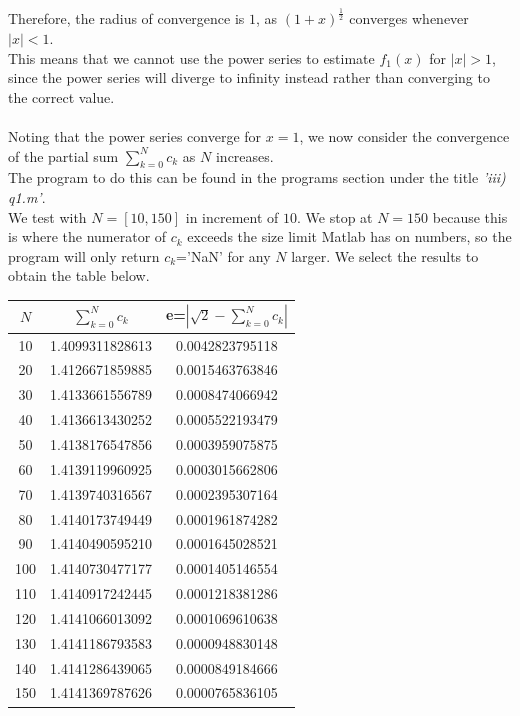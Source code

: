 \documentclass[10pt]{article}
\begin{document}
Therefore, the radius of convergence is $1$, as $(1+x)^{\frac{1}{2}}$ converges whenever $|x|<1$. \\
This means that we cannot use the power series to estimate $f_1(x)$ for $|x|>1$, since the power series will diverge to infinity instead rather than converging to the correct value.\\\\
\noindent Noting that the power series converge for $x=1$, we now consider the convergence of the partial sum $\sum^N_{k=0}c_k$ as $N$ increases.\\
The program to do this can be found in the programs section under the title \emph{'iii) q1.m'}.\\
We test with $N=[10,150]$ in increment of $10$. We stop at $N=150$ because this is where the numerator of $c_k$ exceeds the size limit Matlab has on numbers, so the program will only return $c_k$='NaN' for any $N$ larger. We select the results to obtain the table below.\\
\begin{center}
    \begin{tabular}{c|c|c}
    $N$ & $\sum_{k=0}^N c_k$ & e=$|\sqrt{2}-\sum_{k=0}^N c_k|$\\
    \hline
    10  & 1.4099311828613  & 0.0042823795118 \\
    20  & 1.4126671859885  & 0.0015463763846\\
    30  & 1.4133661556789  & 0.0008474066942\\
    40  & 1.4136613430252  & 0.0005522193479\\
    50  & 1.4138176547856  & 0.0003959075875\\
    60  & 1.4139119960925  & 0.0003015662806\\
    70  & 1.4139740316567  & 0.0002395307164\\
    80  & 1.4140173749449  & 0.0001961874282\\
    90  & 1.4140490595210  & 0.0001645028521\\
    100 & 1.4140730477177 &  0.0001405146554\\
    110 & 1.4140917242445 &  0.0001218381286\\
    120 & 1.4141066013092 &  0.0001069610638\\
    130 & 1.4141186793583 &  0.0000948830148\\
    140 & 1.4141286439065 &  0.0000849184666\\
    150 & 1.4141369787626 &  0.0000765836105
    \end{tabular}
\end{center}
\end{document}
